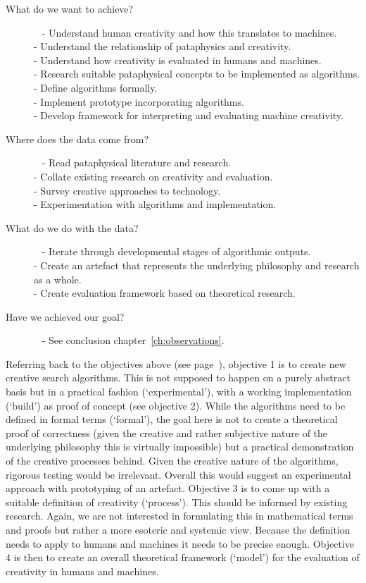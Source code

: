 \begin{description}
  \item[What do we want to achieve?]~
    - Understand human creativity and how this translates to machines.\\
    - Understand the relationship of pataphysics and creativity.\\
    - Understand how creativity is evaluated in humans and machines.\\
    - Research suitable pataphysical concepts to be implemented as algorithms.\\ 
    - Define algorithms formally.\\
    - Implement prototype incorporating algorithms.\\
    - Develop framework for interpreting and evaluating machine creativity.
	\item[Where does the data come from?]~
    - Read pataphysical literature and research.\\
    - Collate existing research on creativity and evaluation.\\
    - Survey creative approaches to technology.\\
    - Experimentation with algorithms and implementation.
	\item[What do we do with the data?]~
    - Iterate through developmental stages of algorithmic outputs.\\
    - Create an artefact that represents the underlying philosophy and research as a whole.\\
    - Create evaluation framework based on theoretical research.
  \item[Have we achieved our goal?]~
    - See conclusion chapter~\ref{ch:observations}.
\end{description}

Referring back to the objectives above (see page~\pageref{s:objectives}), objective \num{1} is to create new creative search algorithms. This is not supposed to happen on a purely abstract basis but in a practical fashion (`experimental'), with a working implementation (`build') as proof of concept (see objective 2). While the algorithms need to be defined in formal terms (`formal'), the goal here is not to create a theoretical proof of correctness (given the creative and rather subjective nature of the underlying philosophy this is virtually impossible) but a practical demonstration of the creative processes behind. Given the creative nature of the algorithms, rigorous testing would be irrelevant. Overall this would suggest an experimental approach with prototyping of an artefact. Objective \num{3} is to come up with a suitable definition of creativity (`process'). This should be informed by existing research. Again, we are not interested in formulating this in mathematical terms and proofs but rather a more esoteric and systemic view. Because the definition needs to apply to humans and machines it needs to be precise enough. Objective \num{4} is then to create an overall theoretical framework (`model') for the evaluation of creativity in humans and machines.

